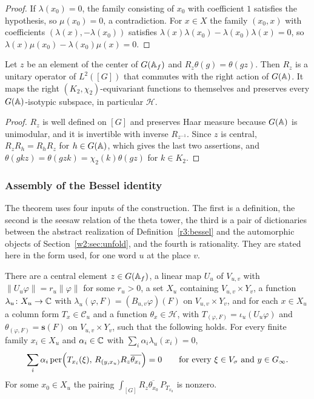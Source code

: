 \begin{proof}
If $\lambda(x_0)=0$, the family consisting of $x_0$ with coefficient $1$ satisfies the hypothesis, so $\mu(x_0)=0$, a contradiction. For $x\in X$ the family $(x_0,x)$ with coefficients $(\lambda(x),-\lambda(x_0))$ satisfies $\lambda(x)\lambda(x_0)-\lambda(x_0)\lambda(x)=0$, so $\lambda(x)\mu(x_0)-\lambda(x_0)\mu(x)=0$.
\end{proof}

\begin{lemma}\label{w2:central}
Let $z$ be an element of the center of $G(\mathbb A_f)$ and $R_z\theta(g)=\theta(gz)$. Then $R_z$ is a unitary operator of $L^2([G])$ that commutes with the right action of $G(\mathbb A)$. It maps the right $(K_2,\chi_2)$-equivariant functions to themselves and preserves every $G(\mathbb A)$-isotypic subspace, in particular $\mathcal H$.
\end{lemma}

\begin{proof}
$R_z$ is well defined on $[G]$ and preserves Haar measure because $G(\mathbb A)$ is unimodular, and it is invertible with inverse $R_{z^{-1}}$. Since $z$ is central, $R_zR_h=R_hR_z$ for $h\in G(\mathbb A)$, which gives the last two assertions, and $\theta(gkz)=\theta(gzk)=\chi_2(k)\theta(gz)$ for $k\in K_2$.
\end{proof}

\subsubsection{Assembly of the Bessel identity}\label{w2:sec:assembleB}

The theorem uses four inputs of the construction. The first is a definition, the second is the seesaw relation of the theta tower, the third is a pair of dictionaries between the abstract realization of Definition~\ref{r3:bessel} and the automorphic objects of Section~\ref{w2:sec:unfold}, and the fourth is rationality. They are stated here in the form used, for one word $u$ at the place $v$.

\begin{hypothesis}\label{w2:H-see}
There are a central element $z\in G(\mathbb A_f)$, a linear map $U_u$ of $V_{u,v}$ with $\lVert U_u\varphi\rVert=r_u\lVert\varphi\rVert$ for some $r_u>0$, a set $X_u$ containing $V_{u,v}\times Y_v$, a function $\lambda_u\colon X_u\to\mathbb C$ with $\lambda_u(\varphi,F)=(B_{u,v}\varphi)(F)$ on $V_{u,v}\times Y_v$, and for each $x\in X_u$ a column form $T_x\in\mathcal C_u$ and a function $\theta_x\in\mathcal H$, with $T_{(\varphi,F)}=\iota_u(U_u\varphi)$ and $\theta_{(\varphi,F)}=\mathbf s(F)$ on $V_{u,v}\times Y_v$, such that the following holds. For every finite family $x_i\in X_u$ and $\alpha_i\in\mathbb C$ with $\sum_i\alpha_i\lambda_u(x_i)=0$,
\[
\sum_i\alpha_i\,\mathrm{per}\Bigl(T_{x_i}(\xi),\,R_{(y,x_u)}R_z\overline{\theta_{x_i}}\Bigr)=0\qquad\text{for every }\xi\in V_\sigma\text{ and }y\in G_\infty.
\]
For some $x_0\in X_u$ the pairing $\int_{[G]}R_z\overline{\theta_{x_0}}\,P_{T_{x_0}}$ is nonzero.
\end{hypothesis}

